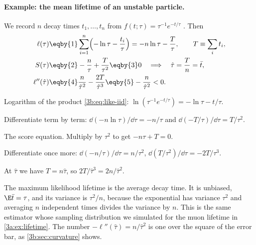 \paragraph{Example: the mean lifetime of an unstable particle.}
We record $n$ decay times $t_1,\dots,t_n$ from $f(t;\tau)=\tau^{-1}e^{-t/\tau}$
. Then
\begin{align}
  \ell(\tau)&\eqby{1}\sum_{i=1}^n\Bigl(-\ln\tau-\frac{t_i}{\tau}\Bigr)
             =-n\ln\tau-\frac{T}{\tau},\qquad T\equiv\sum_it_i,
  \nonumber\\
  S(\tau)&\eqby{2}-\frac n\tau+\frac{T}{\tau^2}
          \eqby{3}0
  \quad\Longrightarrow\quad
  \hat\tau=\frac Tn=\bar t,
  \label{3b:eq:tau-mle}\\
  \ell''(\hat\tau)&\eqby{4}\frac{n}{\hat\tau^2}-\frac{2T}{\hat\tau^3}
   \eqby{5}-\frac{n}{\hat\tau^2}<0 .
  \nonumber
\end{align}
\begin{explain}
  \item Logarithm of the product \eqref{3b:eq:like-iid}:
        $\ln(\tau^{-1}e^{-t/\tau})=-\ln\tau-t/\tau$.
  \item Differentiate term by term: $\dd(-n\ln\tau)/\dd\tau=-n/\tau$ and
        $\dd(-T/\tau)/\dd\tau=T/\tau^2$.
  \item The score equation. Multiply by $\tau^2$ to get $-n\tau+T=0$.
  \item Differentiate once more: $\dd(-n/\tau)/\dd\tau=n/\tau^2$,
        $\dd(T/\tau^2)/\dd\tau=-2T/\tau^3$.
  \item At $\hat\tau$ we have $T=n\hat\tau$, so $2T/\hat\tau^3=2n/\hat\tau^2$.
\end{explain}
The maximum likelihood lifetime is the average decay time. It is unbiased,
$\E\bar t=\tau$, and its variance is $\tau^2/n$, because the exponential has
variance $\tau^2$ and averaging $n$ independent times divides the variance
by $n$. This is the same estimator whose sampling distribution we simulated
for the muon lifetime in \cref{3a:ex:lifetime}. The number
$-\ell''(\hat\tau)=n/\hat\tau^2$ is one over the square of the error bar, as
\cref{3b:sec:curvature} shows.


